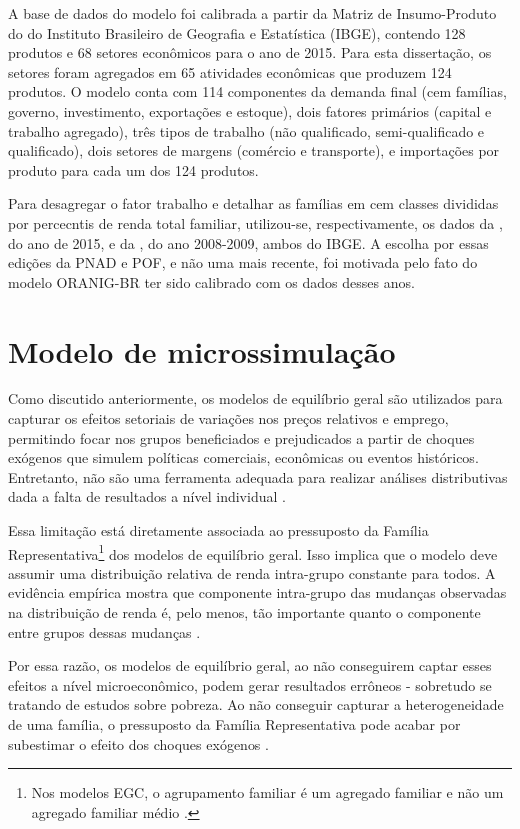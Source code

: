 A base de dados do modelo foi calibrada a partir da Matriz de Insumo-Produto do  do Instituto Brasileiro de Geografia e Estatística (IBGE), contendo 128 produtos e 68 setores econômicos para o ano de 2015. Para esta dissertação, os setores foram agregados em 65 atividades econômicas que produzem 124 produtos. O modelo conta com 114 componentes da demanda final (cem famílias, governo, investimento, exportações e estoque), dois fatores primários (capital e trabalho agregado), três tipos de trabalho (não qualificado, semi-qualificado e qualificado), dois setores de margens (comércio e transporte), e importações por produto para cada um dos 124 produtos.

Para desagregar o fator trabalho e detalhar as famílias em cem classes divididas por percecntis de renda total familiar, utilizou-se, respectivamente, os dados da , do ano de 2015, e da , do ano 2008-2009, ambos do IBGE. A escolha por essas edições da PNAD e POF, e não uma mais recente, foi motivada pelo fato do modelo ORANIG-BR ter sido calibrado com os dados desses anos.



\section{Modelo de microssimulação} \label{sec:microssimulacao}

Como discutido anteriormente, os modelos de equilíbrio geral são utilizados para capturar os efeitos setoriais de variações nos preços relativos e emprego, permitindo focar nos grupos beneficiados e prejudicados a partir de choques exógenos que simulem políticas comerciais, econômicas ou eventos históricos. Entretanto, não são uma ferramenta adequada para realizar análises distributivas dada a falta de resultados a nível individual \cite{tiberti17}.

Essa limitação está diretamente associada ao pressuposto da Família Representativa\footnote{Nos modelos EGC, o agrupamento familiar é um agregado familiar e não um agregado familiar médio \cite{tiberti17}.} dos modelos de equilíbrio geral. Isso implica que o modelo deve assumir uma distribuição relativa de renda intra-grupo constante para todos. A evidência empírica mostra que componente intra-grupo das mudanças observadas na distribuição de renda é, pelo menos, tão importante quanto o componente entre grupos dessas mudanças \cite{colombo08}.

Por essa razão, os modelos de equilíbrio geral, ao não conseguirem captar esses efeitos a nível microeconômico, podem gerar resultados errôneos - sobretudo se tratando de estudos sobre pobreza. Ao não conseguir capturar a heterogeneidade de uma família, o pressuposto da Família Representativa pode acabar por subestimar o efeito dos choques exógenos \cite{colombo08}. 

